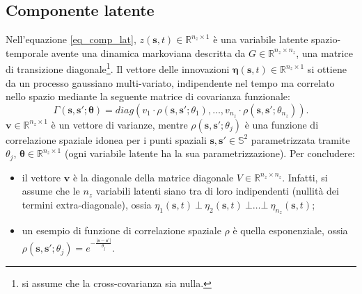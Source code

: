 \subsection[Componente latente]{Componente latente}
Nell'equazione \ref{eq_comp_lat}, $z(\mathbf{s}, t)\in \mathbb{R}^{n_z\times 1}$ è una variabile latente spazio-temporale avente una dinamica markoviana descritta da $G\in\mathbb{R}^{n_z\times n_z}$, una matrice di transizione diagonale\footnote{si assume che la cross-covarianza sia nulla.}. Il vettore delle innovazioni $\boldsymbol{\eta}(\mathbf{s}, t)\in\mathbb{R}^{n_z\times 1}$ si ottiene da un processo gaussiano multi-variato, indipendente nel tempo ma correlato nello spazio mediante la seguente matrice di covarianza funzionale:
\begin{equation}
	\Gamma(\mathbf{s}, \mathbf{s}';\boldsymbol{\theta})=diag(v_1\cdot\rho(\mathbf{s}, \mathbf{s}';\theta_1),\dots,v_{n_z}\cdot\rho(\mathbf{s}, \mathbf{s}';\theta_{n_z})).
\end{equation}
$\mathbf{v}\in\mathbb{R}^{n_z\times 1}$ è un vettore di varianze, mentre $\rho(\mathbf{s}, \mathbf{s}'; \theta_j)$ è una funzione di correlazione spaziale idonea per i punti spaziali $\mathbf{s}, \mathbf{s}'\in\mathbb{S}^2$ parametrizzata tramite $\theta_j$, $\boldsymbol{\theta}\in\mathbb{R}^{n_z\times 1}$ (ogni variabile latente ha la sua parametrizzazione). Per concludere:
\begin{itemize}
	\item il vettore $\mathbf{v}$ è la diagonale della matrice diagonale $V\in\mathbb{R}^{n_z\times n_z}$. Infatti, si assume che le $n_z$ variabili latenti siano tra di loro indipendenti (nullità dei termini extra-diagonale), ossia $\eta_1(\mathbf{s}, t)\ \bot\ \eta_2(\mathbf{s}, t)\ \bot\dots\bot \ \eta_{n_z}(\mathbf{s}, t)$;
	\item un esempio di funzione di correlazione spaziale $\rho$ è quella esponenziale, ossia $\rho(\mathbf{s}, \mathbf{s}'; \theta_j) = e^{-\frac{\lvert\mathbf{s} - \mathbf{s}'\lvert}{\theta_j}}$.
\end{itemize}


